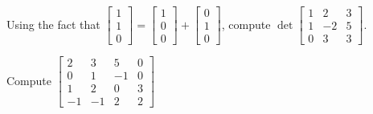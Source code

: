 \begin{applicationActivities}{2}{26}
\begin{activity}{10}
   Using the fact that $\begin{bmatrix} 1 \\ 1 \\ 0 \end{bmatrix} = \begin{bmatrix} 1 \\ 0 \\ 0 \end{bmatrix} + \begin{bmatrix} 0 \\ 1 \\ 0 \end{bmatrix}$, compute $\det \begin{bmatrix} 1 & 2 & 3 \\ 1 & -2 & 5 \\ 0 & 3 & 3 \end{bmatrix}$.
\end{activity}

\begin{activity}{10}
   Compute $\begin{bmatrix} 2 & 3 & 5 & 0 \\ 0 & 1 & -1 & 0 \\ 1 & 2 & 0 & 3 \\ -1 & -1 & 2 & 2 \end{bmatrix}$
\end{activity}

\end{applicationActivities}
